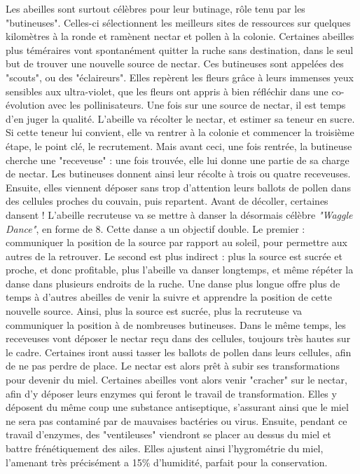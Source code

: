 			Les abeilles sont surtout célèbres pour leur butinage, rôle tenu par les "butineuses". Celles-ci sélectionnent les meilleurs sites de ressources sur quelques kilomètres à la ronde et ramènent nectar et pollen à la colonie. Certaines abeilles plus téméraires vont spontanément quitter la ruche sans destination, dans le seul but de trouver une nouvelle source de nectar. Ces butineuses sont appelées des "scouts", ou des "éclaireurs". Elles repèrent les fleurs grâce à leurs immenses yeux sensibles aux ultra-violet, que les fleurs ont appris à bien réfléchir dans une co-évolution avec les pollinisateurs. Une fois sur une source de nectar, il est temps d'en juger la qualité. L'abeille va récolter le nectar, et estimer sa teneur en sucre. Si cette teneur lui convient, elle va rentrer à la colonie et commencer la troisième étape, le point clé, le recrutement. Mais avant ceci, une fois rentrée, la butineuse cherche une "receveuse" : une fois trouvée, elle lui donne une partie de sa charge de nectar. Les butineuses donnent ainsi leur récolte à trois ou quatre receveuses. Ensuite, elles viennent déposer sans trop d'attention leurs ballots de pollen dans des cellules proches du couvain, puis repartent. Avant de décoller, certaines dansent ! L'abeille recruteuse va se mettre à danser la désormais célèbre \textit{"Waggle Dance"}, en forme de 8. Cette danse a un objectif double. Le premier : communiquer la position de la source par rapport au soleil, pour permettre aux autres de la retrouver. Le second est plus indirect : plus la source est sucrée et proche, et donc profitable, plus l'abeille va danser longtemps, et même répéter la danse dans plusieurs endroits de la ruche. Une danse plus longue offre plus de temps à d'autres abeilles de venir la suivre et apprendre la position de cette nouvelle source. Ainsi, plus la source est sucrée, plus la recruteuse va communiquer la position à de nombreuses butineuses.
			Dans le même temps, les receveuses vont déposer le nectar reçu dans des cellules, toujours très hautes sur le cadre. Certaines iront aussi tasser les ballots de pollen dans leurs cellules, afin de ne pas perdre de place. Le nectar est alors prêt à subir ses transformations pour devenir du miel. Certaines abeilles vont alors venir "cracher" sur le nectar, afin d'y déposer leurs enzymes qui feront le travail de transformation. Elles y déposent du même coup une substance antiseptique, s'assurant ainsi que le miel ne sera pas contaminé par de mauvaises bactéries ou virus. Ensuite, pendant ce travail d'enzymes, des "ventileuses" viendront se placer au dessus du miel et battre frénétiquement des ailes. Elles ajustent ainsi l'hygrométrie du miel, l'amenant très précisément a 15\% d'humidité, parfait pour la conservation.
			
